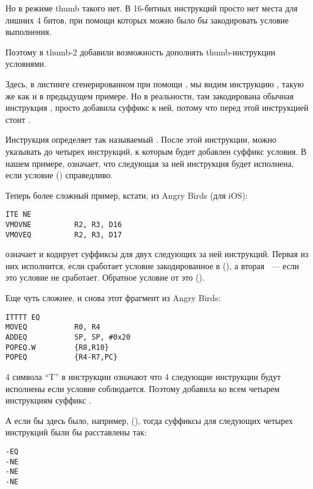 Но в режиме thumb такого нет. В 16-битных инструкций просто нет места для лишних 4 битов, при помощи
которых можно было бы закодировать условие выполнения.

Поэтому в thumb-2 добавили возможность дополнять thumb-инструкции условиями.

Здесь, в листинге сгенерированном при помощи \IDA, мы видим инструкцию , 
такую же как и в предыдущем
примере. Но в реальности, там закодирована обычная инструкция , просто \IDA добавила 
суффикс  к ней,
потому что перед этой инструкцией стоит .

Инструкция  определяет так называемый . После этой инструкции, можно указывать 
до четырех инструкций, к которым будет добавлен суффикс условия. В нашем примере,  означает,
что следующая за ней инструкция будет исполнена, если условие  () справедливо.

Теперь более сложный пример, кстати, из Angry Birds (для iOS):

\begin{lstlisting}[caption=Angry Birds Classic]
ITE NE
VMOVNE          R2, R3, D16
VMOVEQ          R2, R3, D17
\end{lstlisting}

 означает  и кодирует суффиксы для двух следующих за ней инструкций. Первая из них
исполнится, если сработает условие закодированное в  (), а вторая ~--- 
если это условие не сработает. 
Обратное условие от  это  ().

Еще чуть сложнее, и снова этот фрагмент из Angry Birds:

\begin{lstlisting}[caption=Angry Birds Classic]
ITTTT EQ
MOVEQ           R0, R4
ADDEQ           SP, SP, #0x20
POPEQ.W         {R8,R10}
POPEQ           {R4-R7,PC}
\end{lstlisting}

4 символа ``T'' в инструкции означают что 4 следующие инструкции будут исполнены если условие соблюдается. 
Поэтому
\IDA добавила ко всем четырем инструкциям суффикс . 

А если бы здесь было, например,  (), 
тогда суффиксы для следующих четырех инструкций были бы расставлены так:

\begin{lstlisting}
-EQ
-NE
-NE
-NE
\end{lstlisting}

